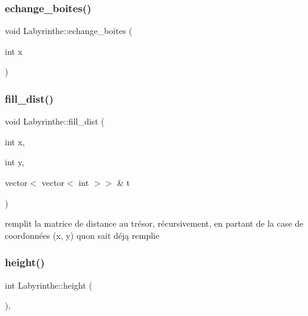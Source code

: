 \subsubsection{\texorpdfstring{echange\+\_\+boites()}{echange\_boites()}}
{\footnotesize\ttfamily void Labyrinthe\+::echange\+\_\+boites (\begin{DoxyParamCaption}\item[{int}]{x }\end{DoxyParamCaption})\hspace{0.3cm}{\ttfamily [private]}}

\mbox{\label{classLabyrinthe_aa420cdcee7e54812b8faa5b27f317955}} 
\subsubsection{\texorpdfstring{fill\+\_\+dist()}{fill\_dist()}}
{\footnotesize\ttfamily void Labyrinthe\+::fill\+\_\+dist (\begin{DoxyParamCaption}\item[{int}]{x,  }\item[{int}]{y,  }\item[{vector$<$ vector$<$ int $>$$>$ \&}]{t }\end{DoxyParamCaption})\hspace{0.3cm}{\ttfamily [private]}}



remplit la matrice de distance au trésor, récursivement, en partant de la case de coordonnées (x, y) qu\textquotesingle{}on sait déją remplie 

\mbox{\label{classLabyrinthe_a71d545c9606ad5e8bf840293f22e552b}} 
\subsubsection{\texorpdfstring{height()}{height()}}
{\footnotesize\ttfamily int Labyrinthe\+::height (\begin{DoxyParamCaption}{ }\end{DoxyParamCaption})\hspace{0.3cm}{\ttfamily [inline]}, {\ttfamily [virtual]}}




